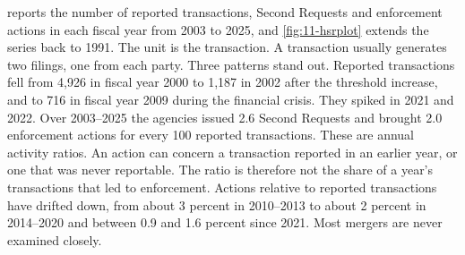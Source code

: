  reports the number of reported transactions, Second Requests and enforcement actions in each
fiscal year from 2003 to 2025, and \cref{fig:11-hsrplot} extends the series back to 1991. The unit is the
transaction. A transaction usually generates two filings, one from each party. Three patterns stand out. Reported
transactions fell from 4,926 in fiscal year 2000 to 1,187 in 2002 after the threshold increase, and to 716 in fiscal
year 2009 during the financial crisis. They spiked in 2021 and 2022. Over 2003--2025 the agencies issued 2.6 Second
Requests and brought 2.0 enforcement actions for every 100 reported transactions. These are annual activity ratios.
An action can concern a transaction reported in an earlier year, or one that was never reportable. The ratio is
therefore not the share of a year's transactions that led to enforcement. Actions relative to reported transactions
have drifted down, from about 3 percent in 2010--2013 to about 2 percent in 2014--2020 and between 0.9 and 1.6
percent since 2021. Most mergers are never examined closely.

